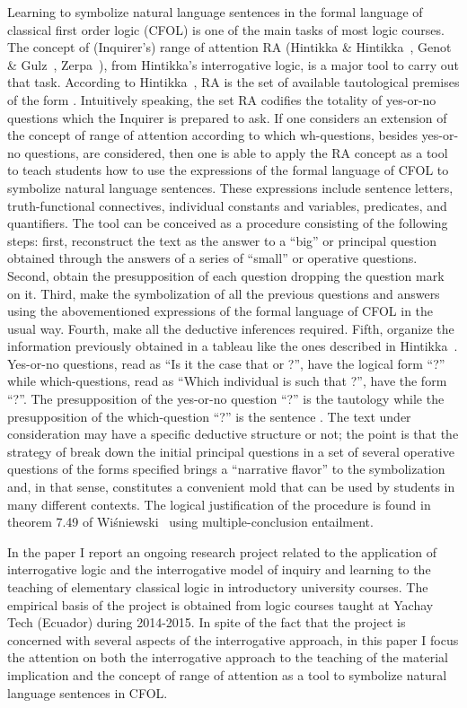 \documentclass[a4paper,UKenglish]{lipics}
\begin{document}
Learning to symbolize natural language sentences in the formal language of classical first order logic (CFOL) is one of the main tasks of most logic courses. The concept of (Inquirer’s) range of attention RA (Hintikka \& Hintikka~\cite{HintikkaAndHintikka}, Genot \& Gulz~\cite{GenotAndGulz}, Zerpa~\cite{Zerpa}), from Hintikka’s interrogative logic, is a major tool to carry out that task. According to  Hintikka~\cite{Hintikka}, RA is the set of available tautological premises of the form . Intuitively speaking, the set RA codifies the totality of yes-or-no questions which the Inquirer is prepared to ask. If one considers an extension of the concept of range of attention according to which wh-questions, besides yes-or-no questions, are considered, then one is able to apply the RA concept as a tool to teach students how to use the expressions of the formal language of CFOL to symbolize natural language sentences. These expressions include sentence letters, truth-functional connectives, individual constants and variables, predicates, and quantifiers. The tool can be conceived as a procedure consisting of the following steps: first, reconstruct the text as the answer to a “big” or principal question obtained through the answers of a series of “small” or operative questions. Second, obtain the presupposition of each question dropping the question mark on it. Third, make the symbolization of all the previous questions and answers using the abovementioned expressions of the formal language of CFOL in the usual way. Fourth, make all the deductive inferences required. Fifth, organize the information previously obtained in a tableau like the ones described in Hintikka~\cite{Hintikka}. Yes-or-no questions, read as “Is it the case that  or ?”, have the logical form “?” while which-questions, read as “Which individual  is such that ?”, have the form “?”.  The presupposition of the yes-or-no question “?” is the tautology  while the presupposition of the which-question “?” is the sentence . The text under consideration may have a specific deductive structure or not; the point is that the strategy of break down the initial principal questions in a set of several operative questions of the forms specified brings a “narrative flavor” to the symbolization and, in that sense, constitutes a convenient mold that can be used by students in many different contexts. The logical justification of the procedure is found in theorem 7.49 of Wiśniewski~\cite{Wiśniewski} using multiple-conclusion entailment.

In the paper I report an ongoing research project related to the application of interrogative logic and the interrogative model of inquiry and learning to the teaching of elementary classical logic in introductory university courses. The empirical basis of the project is obtained from logic courses taught at Yachay Tech (Ecuador) during 2014-2015. In spite of the fact that the project is concerned with several aspects of the interrogative approach, in this paper I focus the attention on both the interrogative approach to the teaching of the material implication and the concept of range of attention as a tool to symbolize natural language sentences in CFOL.
\end{document}
